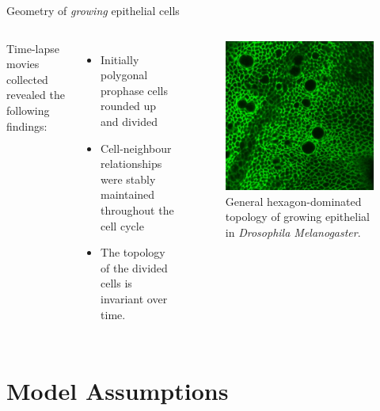 \documentclass[aspectratio=169, 10pt]{beamer}
\begin{document}
\begin{frame}[fragile]{Geometry of \emph{growing} epithelial cells}    
    
    \begin{columns}[onlytextwidth]
        Time-lapse movies collected revealed the following findings:
          \begin{itemize}
            \item Initially polygonal prophase cells rounded up and divided
            \item Cell-neighbour relationships were stably maintained throughout the cell cycle
            \item The topology of the divided cells is invariant over time.
          \end{itemize}
       
         
            \begin{figure}
                \centering
                \includegraphics[width=.7\textwidth]{figures/supfig1.png}
                \caption{General hexagon-dominated topology of growing epithelial in \emph{Drosophila Melanogaster}.}
                \label{}
            \end{figure}
    \end{columns}
\end{frame}

\section{Model Assumptions}
\end{document}
